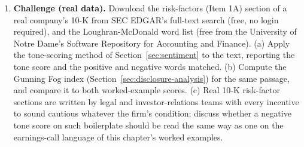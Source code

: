 \documentclass[../ai_in_finance]{subfiles}
\begin{document}
\begin{enumerate}[exercises]
    \item \textbf{Challenge (real data).} Download the risk-factors (Item 1A) section of a real company's 10-K from SEC EDGAR's full-text search (free, no login required), and the Loughran-McDonald word list (free from the University of Notre Dame's Software Repository for Accounting and Finance). (a) Apply the tone-scoring method of Section~\ref{sec:sentiment} to the text, reporting the tone score and the positive and negative words matched. (b) Compute the Gunning Fog index (Section~\ref{sec:disclosure-analysis}) for the same passage, and compare it to both worked-example scores. (c) Real 10-K risk-factor sections are written by legal and investor-relations teams with every incentive to sound cautious whatever the firm's condition; discuss whether a negative tone score on such boilerplate should be read the same way as one on the earnings-call language of this chapter's worked examples.
\end{enumerate}

\end{document}
